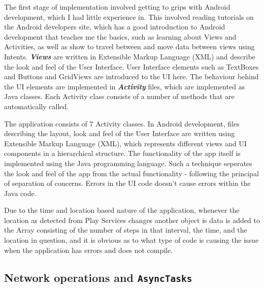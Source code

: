 \documentclass{l4proj}
\begin{document}
The first stage of implementation involved getting to grips with Android development, which I had little experience in. This involved reading tutorials on the Android developers site, which has a good introduction to Android development that teaches me the basics, such as learning about Views and Activities, as well as show to travel between and move data between views using Intents. \textbf{\textit{Views}} are written in Extensible Markup Language (XML) and describe the look and feel of the User Interface. User Interface elements such as TextBoxes and Buttons and GridViews are introduced to the UI here. The behaviour behind the UI elements are implemented in \textbf{\textit{Activity}} files, which are implemented as Java classes. Each Activity class consists of a number of methods that are automatically called.

The application consists of 7 Activity classes. In Android development, files describing the layout, look and feel of the User Interface are written using Extensible Markup Language (XML), which represents different views and UI components in a hierarchical structure. The functionality of the app itself is implemented using the Java programming language. Such a technique seperates the look and feel of the app from the actual functionality - following the principal of separation of concerns. Errors in the UI code doesn't cause errors within the Java code.

Due to the time and location based nature of the application, whenever the location as detected from Play Services changes another object is data is added to the Array consisting of the number of steps in that interval, the time, and the location in question,  and it is obvious as to what type of code is causing the issue when the application has errors and does not compile. 

\subsection{Network operations and \texttt{AsyncTasks}}
\end{document}
